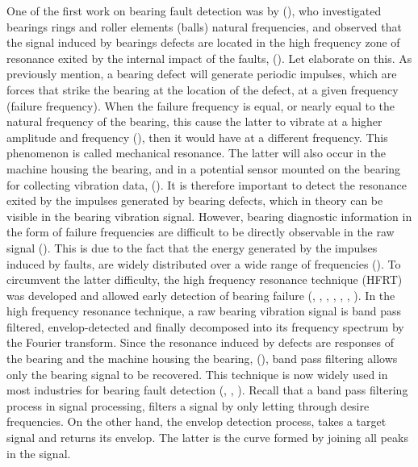 \documentclass[../Main/thesis.tex]{subfiles}
\begin{document}
\justify
One of the first work on bearing fault detection was by (\cite{balderston1969}), who investigated bearings rings and roller elements (balls) natural frequencies, and observed that the signal induced by bearings defects are located in the high frequency zone of resonance exited by the internal impact of the faults, (\cite{randal2010}). Let elaborate on this. As previously mention, a bearing defect will generate periodic impulses, which are forces that strike the bearing at the location of the defect, at a given frequency (failure frequency). When the failure frequency is equal, or nearly equal to the natural frequency of the bearing, this cause the latter to vibrate at a higher amplitude and frequency (\cite{mcfadden1984a}), then it would have at a different frequency. This phenomenon is called mechanical resonance. The latter will also occur in the machine housing the bearing, and in a potential sensor mounted on the bearing for collecting vibration data, (\cite{mcfadden1984a}).
\justify
 It is therefore important to detect the resonance exited by the impulses generated by bearing defects, which in theory can be visible in the bearing vibration signal. However, bearing diagnostic information in the form of failure frequencies are  difficult to be directly observable in the raw signal (\cite{randal2010}). This is due to the fact that the energy generated by the impulses induced by faults, are widely distributed over a wide range of frequencies (\cite{randal2010}).
 \justify
 To circumvent the latter difficulty, the high frequency resonance technique (HFRT) was developed and  allowed early detection of bearing failure (\cite{broderick1972}, \cite{burchill1973}, \cite{burchill1973b}, \cite{darlow1974}, \cite{darlow1975}, \cite{darlow1975b}, \cite{board1975}).
In the high frequency resonance technique, a raw bearing vibration signal is  band pass filtered, envelop-detected and finally decomposed into its frequency spectrum by the Fourier transform. Since the resonance induced by defects are responses of the bearing and the machine housing the bearing, (\cite{mcfadden1984a}), band pass filtering allows only the bearing signal to be recovered. This technique is now widely used in most industries for bearing fault detection (\cite{gupta2016}, \cite{khadersab2018}, \cite{randal2010}). Recall that a band pass filtering process in signal processing, filters a signal by only letting through desire frequencies. On the other hand, the envelop detection process, takes a target signal and returns its envelop. The latter is the curve formed by joining all peaks in the signal.
\end{document}
